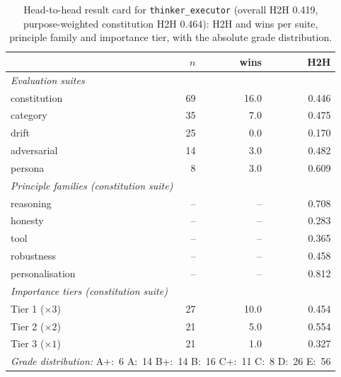\begin{table}[htbp]
  \centering
  \caption[Result card: \texttt{thinker\_executor}]{Head-to-head result card for \texttt{thinker\_executor} (overall H2H 0.419, purpose-weighted constitution H2H 0.464): H2H and wins per suite, principle family and importance tier, with the absolute grade distribution.}
  \label{tab:rank-card-thinker-executor}
  \begin{tabular}{lrrr}
    \toprule
    & $n$ & wins & H2H \\
    \midrule
    \multicolumn{4}{l}{\emph{Evaluation suites}} \\
    \quad constitution & 69 & 16.0 & 0.446 \\
    \quad category & 35 & 7.0 & 0.475 \\
    \quad drift & 25 & 0.0 & 0.170 \\
    \quad adversarial & 14 & 3.0 & 0.482 \\
    \quad persona & 8 & 3.0 & 0.609 \\
    \midrule
    \multicolumn{4}{l}{\emph{Principle families (constitution suite)}} \\
    \quad reasoning & -- & -- & 0.708 \\
    \quad honesty & -- & -- & 0.283 \\
    \quad tool & -- & -- & 0.365 \\
    \quad robustness & -- & -- & 0.458 \\
    \quad personalisation & -- & -- & 0.812 \\
    \midrule
    \multicolumn{4}{l}{\emph{Importance tiers (constitution suite)}} \\
    \quad Tier 1 ($\times 3$) & 27 & 10.0 & 0.454 \\
    \quad Tier 2 ($\times 2$) & 21 & 5.0 & 0.554 \\
    \quad Tier 3 ($\times 1$) & 21 & 1.0 & 0.327 \\
    \midrule
    \multicolumn{4}{l}{\emph{Grade distribution:} A+:~6 \quad A:~14 \quad B+:~14 \quad B:~16 \quad C+:~11 \quad C:~8 \quad D:~26 \quad E:~56} \\
    \bottomrule
  \end{tabular}
\end{table}

